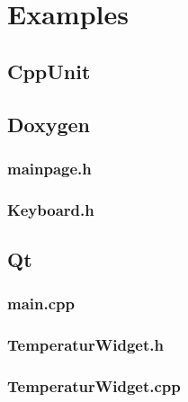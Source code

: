 \section{Examples}

\subsection{CppUnit}


\newpage
\subsection{Doxygen}
\subsubsection{mainpage.h}

\subsubsection{Keyboard.h}


\newpage
\subsection{Qt}
\subsubsection{main.cpp}

\subsubsection{TemperaturWidget.h}

\subsubsection{TemperaturWidget.cpp}
